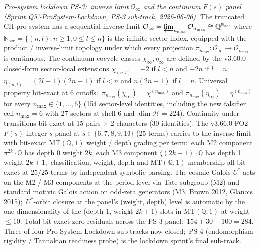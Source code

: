 \documentclass[11pt,a4paper]{article}
\theoremstyle{plain}
\theoremstyle{definition}
\begin{document}
\emph{Pro-system lockdown PS-3:\ inverse limit $\mathcal{O}_\infty$
and the continuum $F(s)$ panel (Sprint Q5'-ProSystem-Lockdown, PS-3
sub-track, 2026-06-06).}  The
truncated CH pro-system has a sequential inverse limit
$\mathcal{O}_\infty = \varprojlim_{n_{\max}} \mathcal{O}_{n_{\max}}
\cong \mathbb{Q}^{\mathbb{N}_{\mathrm{sec}}}$ where
$\mathbb{N}_{\mathrm{sec}} = \{(n, l) : n \ge 1, 0 \le l \le n\}$
is the infinite sector index, equipped with the product /
inverse-limit topology under which every projection
$\pi_{n_{\max}}: \mathcal{O}_\infty \to \mathcal{O}_{n_{\max}}$ is
continuous.  The continuum cocycle classes $\chi_\infty, \eta_\infty$
are defined by the v3.60.0 closed-form sector-local extensions
$\chi_{(n, l)} = +2$ if $l < n$ and $-2n$ if $l = n$;\
$\eta_{(n, l)} = (2l + 1)(2n + 1)$ if $l < n$ and $n(2n + 1)$ if
$l = n$.  Universal property bit-exact at 6 cutoffs:\
$\pi_{n_{\max}}(\chi_\infty) = \chi^{(n_{\max})}$ and
$\pi_{n_{\max}}(\eta_\infty) = \eta^{(n_{\max})}$ for every
$n_{\max} \in \{1, \ldots, 6\}$ (154 sector-level identities,
including the new falsifier cell $n_{\max} = 6$ with 27 sectors at
shell 6 and $\dim \mathcal{H} = 224$).  Continuity under transitions
bit-exact at 15 pairs $\times$ 2 characters (30 identities).  The
v3.66.0 FO2 $F(s)$ integer-$s$ panel at $s \in \{6, 7, 8, 9, 10\}$
(25 terms) carries to the inverse limit with bit-exact $\mathrm{MT}(\mathbb{Q}, 1)$
weight / depth grading per term:\ each M2 component
$\pi^{2k} \cdot \mathbb{Q}$ has depth 0 weight $2k$, each M3
component $\zeta(2k + 1) \cdot \mathbb{Q}$ has depth 1 weight
$2k + 1$;\ classification, weight, depth and $\mathrm{MT}(\mathbb{Q}, 1)$ membership all
bit-exact at $25/25$ terms by independent symbolic parsing.  The
cosmic-Galois $U^*$ acts on the M2 / M3 components at the period
level via Tate subgroup (M2) and standard motivic Galois action on
odd-zeta generators (M3, Brown 2012, Glanois 2015);\ $U^*$-orbit
closure at the panel's (weight, depth) level is automatic by the
one-dimensionality of the (depth-1, weight-$2k + 1$) slots in
$\mathrm{MT}(\mathbb{Q}, 1)$ at weight $\le 10$.  Total bit-exact
zero residuals across the PS-3 panel:\ $154 + 30 + 100 = 284$.
Three of four Pro-System-Lockdown sub-tracks now closed;\ PS-4
(endomorphism rigidity / Tannakian readiness probe) is the
lockdown sprint's final sub-track.
\end{document}

